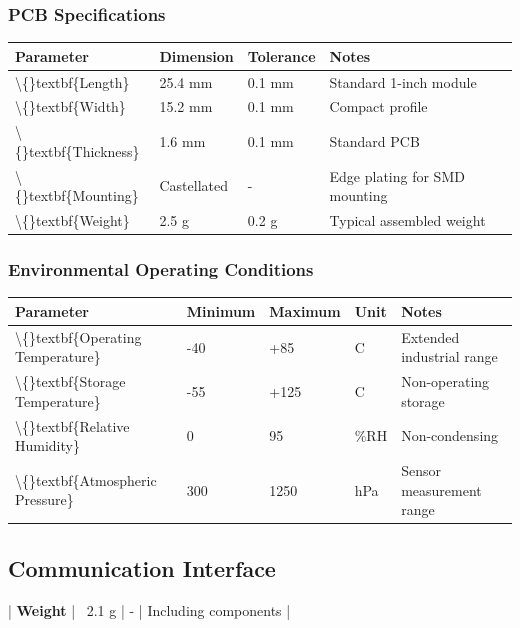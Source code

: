 \documentclass[11pt,a4paper]{article}
\begin{document}
\subsubsection{PCB Specifications}

\begin{table}[H]
\centering
\begin{tabular}{llll}
\toprule
Parameter & Dimension & Tolerance & Notes \\
\midrule
\textbackslash\{\}textbf\{Length\} & 25.4 mm & \textpm{}0.1 mm & Standard 1-inch module \\
\textbackslash\{\}textbf\{Width\} & 15.2 mm & \textpm{}0.1 mm & Compact profile \\
\textbackslash\{\}textbf\{Thickness\} & 1.6 mm & \textpm{}0.1 mm & Standard PCB \\
\textbackslash\{\}textbf\{Mounting\} & Castellated & - & Edge plating for SMD mounting \\
\textbackslash\{\}textbf\{Weight\} & 2.5 g & \textpm{}0.2 g & Typical assembled weight \\
\bottomrule
\end{tabular}
\end{table}


\subsubsection{Environmental Operating Conditions}

\begin{table}[H]
\centering
\begin{tabular}{lllll}
\toprule
Parameter & Minimum & Maximum & Unit & Notes \\
\midrule
\textbackslash\{\}textbf\{Operating Temperature\} & -40 & +85 & \textdegree{}C & Extended industrial range \\
\textbackslash\{\}textbf\{Storage Temperature\} & -55 & +125 & \textdegree{}C & Non-operating storage \\
\textbackslash\{\}textbf\{Relative Humidity\} & 0 & 95 & \%RH & Non-condensing \\
\textbackslash\{\}textbf\{Atmospheric Pressure\} & 300 & 1250 & hPa & Sensor measurement range \\
\bottomrule
\end{tabular}
\end{table}


\subsection{Communication Interface}
| \textbf{Weight} | ~2.1 g | - | Including components |
\end{document}
